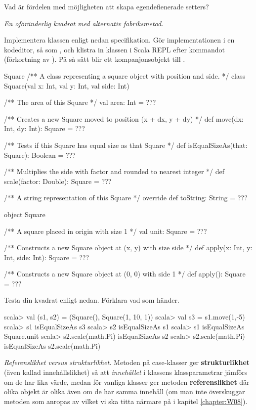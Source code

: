 \Subtask\Pen Vad är fördelen med möjligheten att skapa egendefienerade setters?

\Task \label{task:Square} \emph{En oföränderlig kvadrat med alternativ fabriksmetod.} 

\Subtask Implementera klassen  enligt nedan specifikation. Gör  implementationen i en kodeditor, så som , och klistra in klassen i Scala REPL efter kommandot  (förkortning av ). På så sätt blir  ett kompanjonsobjekt till .

\begin{ScalaSpec}{Square}
/** A class representing a square object with position and side. */
class Square(val x: Int, val y: Int, val side: Int) {
  /** The area of this Square */
  val area: Int = ???
  
  /** Creates a new Square moved to position (x + dx, y + dy) */
  def move(dx: Int, dy: Int): Square = ???
  
  /** Tests if this Square has equal size as that Square */
  def isEqualSizeAs(that: Square): Boolean = ???
  
  /** Multiplies the side with factor and rounded to nearest integer */
  def scale(factor: Double): Square = ???
  
  /** A string representation of this Square */
  override def toString: String = ???
}

object Square {
  /** A square placed in origin with size 1 */
  val unit: Square = ??? 
  
  /** Constructs a new Square object at (x, y) with size side */
  def apply(x: Int, y: Int, side: Int): Square = ???

  /** Constructs a new Square object at (0, 0) with side 1 */
  def apply(): Square = ???
}
\end{ScalaSpec}

\Subtask Testa din kvadrat enligt nedan. Förklara vad som händer.

\begin{REPL}
scala> val (s1, s2) = (Square(), Square(1, 10, 1))
scala> val s3 = s1.move(1,-5)
scala> s1 isEqualSizeAs s3
scala> s2 isEqualSizeAs s1
scala> s1 isEqualSizeAs Square.unit
scala> s2.scale(math.Pi) isEqualSizeAs s2
scala> s2.scale(math.Pi) isEqualSizeAs s2.scale(math.Pi)
\end{REPL}

\Task \emph{Referenslikhet versus strukturlikhet.} Metoden \code{==} på case-klasser ger \textbf{strukturlikhet} (även kallad innehållslikhet) så att \emph{innehållet} i klassens klassparametrar jämförs om de har lika värde, medan för vanliga klasser ger metoden \code{==} \textbf{referenslikhet} där olika objekt är olika även om de har samma innehåll (om man inte överskuggar metoden  som anropas av \code{==} vilket vi ska titta närmare på i kapitel \ref{chapter:W08}).

